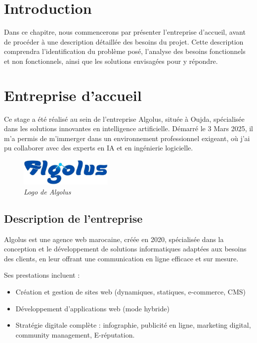 \documentclass[12pt,a4paper]{report}
\begin{document}
	\section{Introduction}
	
	Dans ce chapitre, nous commencerons par présenter l’entreprise d’accueil, avant de procéder à une description détaillée des besoins du projet. Cette description comprendra l’identification du problème posé, l’analyse des besoins fonctionnels et non fonctionnels, ainsi que les solutions envisagées pour y répondre.
	
	\section{Entreprise d’accueil}
	
	Ce stage a été réalisé au sein de l’entreprise Algolus, située à Oujda, spécialisée dans les solutions innovantes en intelligence artificielle. Démarré le 3 Mars 2025, il m’a permis de m’immerger dans un environnement professionnel exigeant, où j’ai pu collaborer avec des experts en IA et en ingénierie logicielle.
	
	\begin{figure}[H]
		\centering
		\includegraphics[width=0.4\textwidth]{algolus-logo.png}
		\caption{\textit{Logo de Algolus}}
		\label{fig:algolus-logo}
	\end{figure}
	
	\subsection{Description de l’entreprise}
	
	Algolus est une agence web marocaine, créée en 2020, spécialisée dans la conception et le développement de solutions informatiques adaptées aux besoins des clients, en leur offrant une communication en ligne efficace et sur mesure.
	
	Ses prestations incluent :
	
	\renewcommand{\labelitemi}{$\bullet$}
	\begin{itemize}
		\item Création et gestion de sites web (dynamiques, statiques, e-commerce, CMS)
		\item Développement d'applications web (mode hybride)
		\item Stratégie digitale complète : infographie, publicité en ligne, marketing digital, community management, E-réputation.
	\end{itemize}
	
\end{document}
